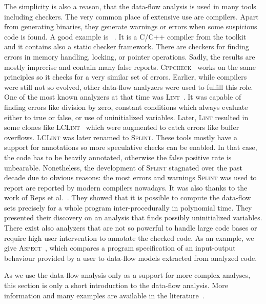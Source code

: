 The simplicity is also a reason, that the data-flow analysis is used in
many tools including checkers.  The very common place of extensive use are
compilers. Apart from generating binaries, they generate warnings or errors
when some suspicious code is found. A good example is \clang~\cite{clang}. It
is a C/C++ compiler from the \llvm toolkit~\cite{llvm} and it contains also a
static checker framework.  There are checkers for finding errors in memory
handling, locking, or pointer operations. Sadly, the results are mostly
imprecise and contain many false reports.  \textsc{Cppcheck}~\cite{cppcheck}
works on the same principles so it checks for a very similar set of errors.
Earlier, while compilers were still not so evolved, other data-flow analyzers
were used to fulfill this role. One of the most known analyzers at that time
was \textsc{Lint}~\cite{lint}. It was capable of finding errors like division
by zero, constant conditions which always evaluate either to true or false, or
use of uninitialized variables.  Later, \textsc{Lint} resulted in some clones
like \textsc{LCLint}~\cite{lclint} which were augmented to catch errors like
buffer overflows. \textsc{LCLint} was later renamed to \textsc{Splint}.  These
tools mostly have a support for annotations so more speculative checks can be
enabled. In that case, the code has to be heavily annotated, otherwise the
false positive rate is unbearable. Nonetheless, the development of
\textsc{Splint} stagnated over the past decade due to obvious reasons: the
most errors and warnings \textsc{Splint} was used to report are reported by
modern compilers nowadays. It was also thanks to the work of Reps et
al.~\cite{dataflow_large}. They showed that it is possible to compute the
data-flow sets precisely for a whole program inter-procedurally in polynomial
time. They presented their discovery on an analysis that finds possibly
uninitialized variables.  There exist also analyzers that are not so powerful
to handle large code bases or require high user intervention to annotate the
checked code. As an example, we give \textsc{Aspect}~\cite{aspect}, which
compares a program specification of an input-output behaviour provided by a
user to data-flow models extracted from analyzed code.

As we use the data-flow analysis only as a support for more complex analyses,
this section is only a short introduction to the data-flow analysis.  More
information and many examples are available in the literature~\cite{dragon,
muchnick}.



